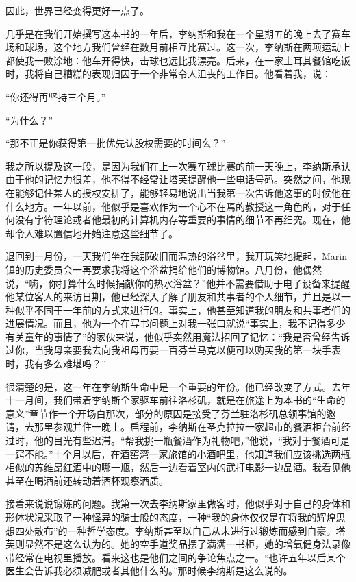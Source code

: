 因此，世界已经变得更好一点了。

 

几乎是在我们开始撰写这本书的一年后，李纳斯和我在一个星期五的晚上去了赛车场和球场，这个地方我们曾经在数月前相互比赛过。这一次，李纳斯在两项运动上都使我一败涂地：他车开得快，击球也远比我漂亮。后来，在一家土耳其餐馆吃饭时，我将自己糟糕的表现归因于一个非常令人沮丧的工作日。他看着我，说：

“你还得再坚持三个月。”

“为什么？”

“那不正是你获得第一批优先认股权需要的时间么？”

我之所以提及这一段，是因为我们在上一次赛车球比赛的前一天晚上，李纳斯承认由于他的记忆力很差，他不得不经常让塔芙提醒他一些电话号码。突然之间，他现在能够记住某人的授权安排了，能够轻易地说出当我第一次告诉他这事的时候他在什么地方。一年以前，他似乎是喜欢作为一个心不在焉的教授这一角色的，对于任何没有字符理论或者他最初的计算机内存等重要的事情的细节不再细究。现在，他却令人难以置信地开始注意这些细节了。

退回到一月份，一天我们坐在我那破旧而温热的浴盆里，我开玩笑地提起，Marin镇的历史委员会一再要求我将这个浴盆捐给他们的博物馆。八月份，他偶然说，“嗨，你打算什么时候捐献你的热水浴盆？”他并不需要借助于电子设备来提醒他某位客人的来访日期，他已经深入了解了朋友和共事者的个人细节，并且是以一种似乎不同于一年前的方式来进行的。事实上，他甚至知道我的朋友和共事者们的进展情况。而且，他为一个在写书问题上对我一张口就说“事实上，我不记得多少有关童年的事情了”的家伙来说，他似乎突然用魔法招回了记忆：“我是否曾经告诉过你，当我母亲要我去向我祖母再要一百芬兰马克以便可以购买我的第一块手表时，我有多么难堪吗？”

很清楚的是，这一年在李纳斯生命中是一个重要的年份。他已经改变了方式。去年十一月间，我们带着李纳斯全家驱车前往洛杉矶，就是在旅途上为本书的“生命的意义”章节作一个开场白那次，部分的原因是接受了芬兰驻洛杉矶总领事馆的邀请，去那里参观并住一晚上。启程前，李纳斯在圣克拉拉一家超市的餐酒柜台前经过时，他的目光有些迟滞。“帮我挑一瓶餐酒作为礼物吧，”他说，“我对于餐酒可是一窍不能。”十个月以后，在酒窖湾一家旅馆的小酒吧里，他知道我们应该挑选两瓶相似的苏维昂红酒中的哪一瓶，然后一边看着室内的武打电影一边品酒。我看见他甚至在喝酒前还转动着酒杯观察酒质。

接着来说说锻炼的问题。我第一次去李纳斯家里做客时，他似乎对于自己的身体和形体状况采取了一种怪异的骑士般的态度，一种“我的身体仅仅是在将我的辉煌思想四处散布”的一种哲学态度。李纳斯甚至以自己从未进行过锻炼而感到自豪。塔芙则显然不是这么认为的。她的空手道奖品摆了满满一书柜，她的增氧健身法录像带经常在电视里播放。看来这也是他们之间的争论焦点之一。“也许五年以后某个医生会告诉我必须减肥或者其他什么的。”那时候李纳斯是这么说的。

